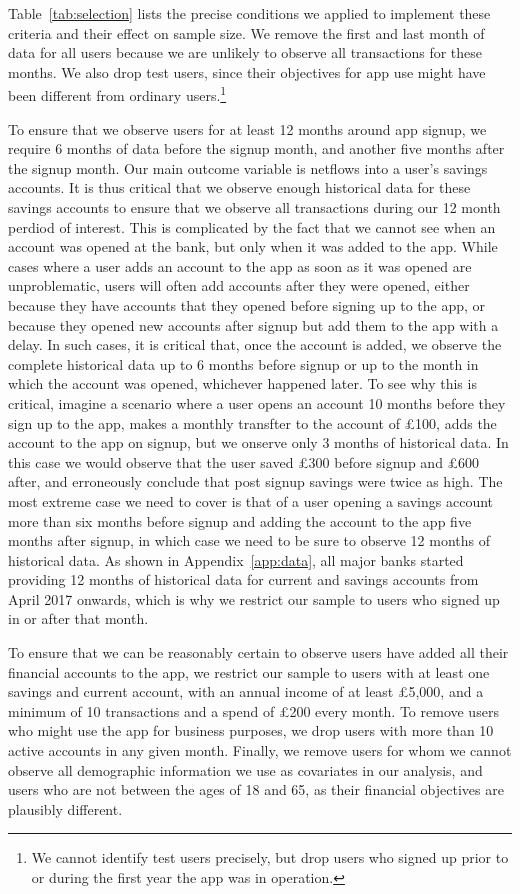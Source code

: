 Table~\ref{tab:selection} lists the precise conditions we applied to implement
these criteria and their effect on sample size. We remove the first and last
month of data for all users because we are unlikely to observe all transactions
for these months. We also drop test users, since their objectives for app use
might have been different from ordinary users.\footnote{We cannot identify test
users precisely, but drop users who signed up prior to or during the first year
the app was in operation.}

To ensure that we observe users for at least 12 months around app signup, we
require 6 months of data before the signup month, and another five months after
the signup month. Our main outcome variable is netflows into a user's savings
accounts. It is thus critical that we observe enough historical data for these
savings accounts to ensure that we observe all transactions during our 12 month
perdiod of interest. This is complicated by the fact that we cannot see when an
account was opened at the bank, but only when it was added to the app. While
cases where a user adds an account to the app as soon as it was opened are
unproblematic, users will often add accounts after they were opened, either
because they have accounts that they opened before signing up to the app, or
because they opened new accounts after signup but add them to the app with a
delay. In such cases, it is critical that, once the account is added, we
observe the complete historical data up to 6 months before signup or up to the
month in which the account was opened, whichever happened later. To see why
this is critical, imagine a scenario where a user opens an account 10 months
before they sign up to the app, makes a monthly transfter to the account of
\pounds100, adds the account to the app on signup, but we onserve only 3 months
of historical data. In this case we would observe that the user saved
\pounds300 before signup and \pounds600 after, and erroneously conclude that
post signup savings were twice as high. The most extreme case we need to cover
is that of a user opening a savings account more than six months before signup
and adding the account to the app five months after signup, in which case we
need to be sure to observe 12 months of historical data. As shown in
Appendix~\ref{app:data}, all major banks started providing 12 months of
historical data for current and savings accounts from April 2017 onwards, which
is why we restrict our sample to users who signed up in or after that month.

To ensure that we can be reasonably certain to observe users have added all
their financial accounts to the app, we restrict our sample to users with at
least one savings and current account, with an annual income of at least
\pounds5,000, and a minimum of 10 transactions and a spend of \pounds200 every
month. To remove users who might use the app for business purposes, we drop
users with more than 10 active accounts in any given month. Finally, we remove
users for whom we cannot observe all demographic information we use as
covariates in our analysis, and users who are not between the ages of 18 and
65, as their financial objectives are plausibly different.


